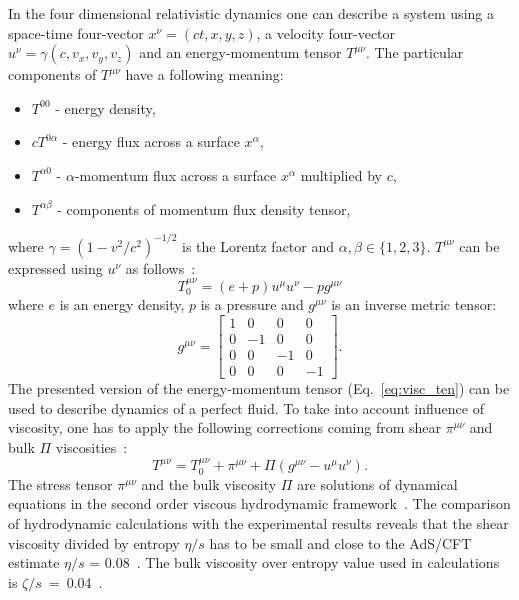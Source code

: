   In the four dimensional relativistic dynamics one can describe a system using a space-time four-vector $x^\nu=(ct,x,y,z)$, a velocity four-vector $u^\nu=\gamma(c,v_x,v_y,v_z)$ and an energy-momentum tensor $T^{\mu\nu}$.
  The particular components of $T^{\mu\nu}$ have a following meaning:
  \begin{itemize}
    \item $T^{00}$ - energy density,
    \item $c T^{0\alpha}$ - energy flux across a surface $x^\alpha$,
    \item $T^{\alpha0}$ - $\alpha$-momentum flux across a surface  $x^\alpha$ multiplied by $c$,
    \item $T^{\alpha\beta}$ - components of momentum flux density tensor,
  \end{itemize}
  where $\gamma = (1-v^2/c^2)^{-1/2}$ is the Lorentz factor and $\alpha,\beta \in \{1,2,3\}$.
  $T^{\mu\nu}$ can be expressed using $u^\nu$ as follows~\cite{israel}:
  \begin{equation}
    \label{eq:visc_ten}
    T^{\mu\nu}_0 = (e+p)u^\mu u^\nu - pg^{\mu\nu}
  \end{equation}
  where $e$ is an energy density, $p$ is a pressure and $g^{\mu\nu}$ is an inverse metric tensor:
  \begin{equation}
    g^{\mu\nu} = 
    \begin{bmatrix}
      1 & 0 & 0 & 0 \\
      0 & -1 & 0 & 0 \\
      0 & 0 & -1 & 0 \\
      0 & 0 & 0 & -1
    \end{bmatrix} .
  \end{equation}
  The presented version of the energy-momentum tensor (Eq.~\ref{eq:visc_ten}) can be used to describe dynamics of a perfect fluid.
  To take into account influence of viscosity, one has to apply the following corrections coming from shear $\pi^{\mu\nu}$ and bulk $\Pi$ viscosities~\cite{visc_hydro}:
  \begin{equation}
    T^{\mu\nu} = T_0^{\mu\nu} + \pi^{\mu\nu} + \Pi(g^{\mu\nu}-u^{\mu}u^{\nu}) .
  \end{equation}
  The stress tensor $\pi^{\mu\nu}$ and the bulk viscosity $\Pi$ are solutions of dynamical equations in the second order viscous hydrodynamic framework~\cite{israel}.
  The comparison of hydrodynamic calculations with the experimental results reveals that the shear viscosity divided by entropy $\eta / s$ has to be small and close to the AdS/CFT estimate $\eta /s$ = 0.08~\cite{visc_hydro,adscft}.
  The bulk viscosity over entropy value used in calculations is $\zeta /s$~=~0.04~\cite{visc_hydro}.
  
